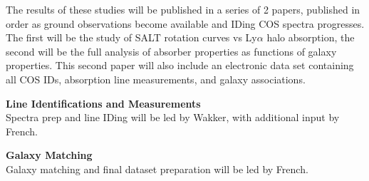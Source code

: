 \documentclass[12pt]{article}
\begin{document}
The results of these studies will be published in a series of 2 papers, published in order as ground observations become available and IDing COS spectra progresses. The first will be the study of SALT rotation curves vs Ly$\alpha$ halo absorption, the second will be the full analysis of absorber properties as functions of galaxy properties. This second paper will also include an electronic data set containing all COS IDs, absorption line measurements, and galaxy associations.





%
%
\budgetnarrative       %

\textbf{Line Identifications and Measurements}\\
\indent Spectra prep and line IDing will be led by Wakker, with additional input by French.

\noindent \textbf{Galaxy Matching}\\
\indent Galaxy matching and final dataset preparation will be led by French.
\end{document}
